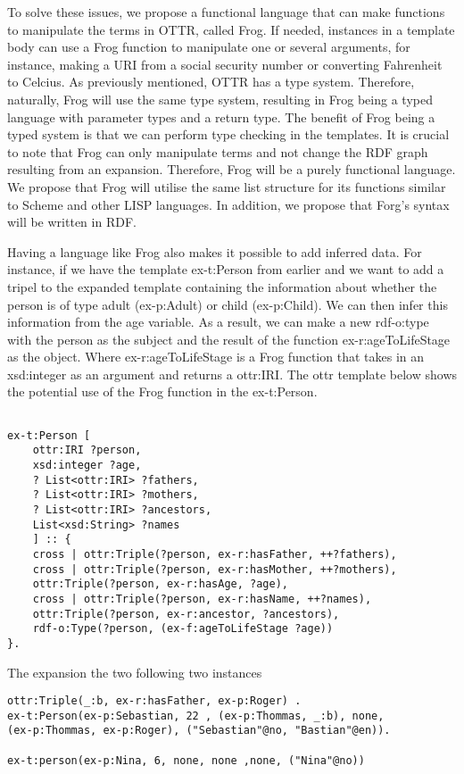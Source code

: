 \para
To solve these issues, we propose a functional language that can make functions to manipulate the terms in OTTR, called Frog. If needed, instances in a template body can use a Frog function to manipulate one or several arguments, for instance,  making a URI from a social security number or converting Fahrenheit to Celcius. As previously mentioned, OTTR has a type system. Therefore, naturally, Frog will use the same type system, resulting in Frog being a typed language with parameter types and a return type.  The benefit of Frog being a typed system is that we can perform type checking in the templates. It is crucial to note that Frog can only manipulate terms and not change the RDF graph resulting from an expansion. Therefore, Frog will be a purely functional language. We propose that Frog will utilise the same list structure for its functions similar to Scheme and other LISP languages. In addition, we propose that Forg's syntax will be written in RDF.

\para
Having a language like Frog also makes it possible to add inferred data. For instance, if we have the template ex-t:Person from earlier and we want to add a tripel to the expanded template containing the information about whether the person is of type adult (ex-p:Adult) or child (ex-p:Child). We can then infer this information from the age variable. As a result, we can make a new rdf-o:type with the person as the subject and the result of the function ex-r:ageToLifeStage as the object. Where ex-r:ageToLifeStage is a Frog function that takes in an xsd:integer as an argument and returns a ottr:IRI. The ottr template below shows the potential use of the Frog function in the ex-t:Person.

\begin{lstlisting}[frame=single]
    
ex-t:Person [
    ottr:IRI ?person,
    xsd:integer ?age,
    ? List<ottr:IRI> ?fathers,
    ? List<ottr:IRI> ?mothers,
    ? List<ottr:IRI> ?ancestors,
    List<xsd:String> ?names
    ] :: {
    cross | ottr:Triple(?person, ex-r:hasFather, ++?fathers),
    cross | ottr:Triple(?person, ex-r:hasMother, ++?mothers),
    ottr:Triple(?person, ex-r:hasAge, ?age),
    cross | ottr:Triple(?person, ex-r:hasName, ++?names),
    ottr:Triple(?person, ex-r:ancestor, ?ancestors),
    rdf-o:Type(?person, (ex-f:ageToLifeStage ?age))
}.
\end{lstlisting}

The expansion the two following two instances

\begin{lstlisting}[frame=single]
ottr:Triple(_:b, ex-r:hasFather, ex-p:Roger) .
ex-t:Person(ex-p:Sebastian, 22 , (ex-p:Thommas, _:b), none, 
(ex-p:Thommas, ex-p:Roger), ("Sebastian"@no, "Bastian"@en)).

ex-t:person(ex-p:Nina, 6, none, none ,none, ("Nina"@no))
\end{lstlisting}

